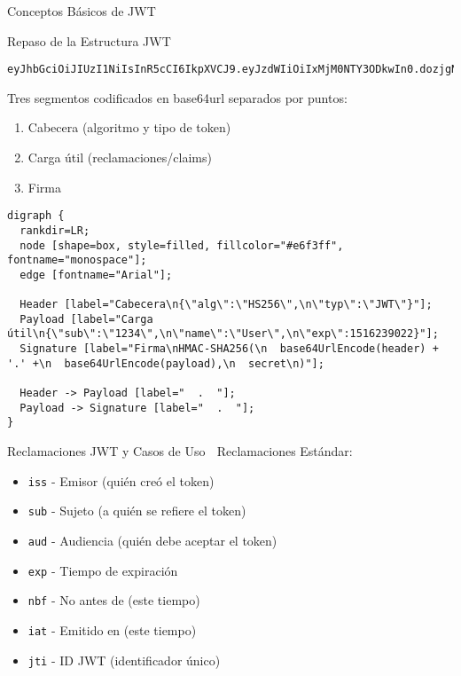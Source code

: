 \documentclass[presentation,aspectratio=169]{beamer}
\begin{document}
\begin{frame}[label={sec:org86199bc},fragile]{Conceptos Básicos de JWT}
 \begin{block}{Repaso de la Estructura JWT 🔰}
\begin{verbatim}
eyJhbGciOiJIUzI1NiIsInR5cCI6IkpXVCJ9.eyJzdWIiOiIxMjM0NTY3ODkwIn0.dozjgNryP4J3jVmNHl0w5N_XgL0n3I9PlFUP0THsR8U
\end{verbatim}

Tres segmentos codificados en base64url separados por puntos:
\begin{enumerate}
\item \alert{Cabecera} (algoritmo y tipo de token)
\item \alert{Carga útil} (reclamaciones/claims)
\item \alert{Firma}
\end{enumerate}

\begin{verbatim}
digraph {
  rankdir=LR;
  node [shape=box, style=filled, fillcolor="#e6f3ff", fontname="monospace"];
  edge [fontname="Arial"];

  Header [label="Cabecera\n{\"alg\":\"HS256\",\n\"typ\":\"JWT\"}"];
  Payload [label="Carga útil\n{\"sub\":\"1234\",\n\"name\":\"User\",\n\"exp\":1516239022}"];
  Signature [label="Firma\nHMAC-SHA256(\n  base64UrlEncode(header) + '.' +\n  base64UrlEncode(payload),\n  secret\n)"];

  Header -> Payload [label="  .  "];
  Payload -> Signature [label="  .  "];
}
\end{verbatim}
\end{block}
\begin{block}{Reclamaciones JWT y Casos de Uso 🔰}
\alert{Reclamaciones Estándar:}
\begin{itemize}
\item \texttt{iss} - Emisor (quién creó el token)
\item \texttt{sub} - Sujeto (a quién se refiere el token)
\item \texttt{aud} - Audiencia (quién debe aceptar el token)
\item \texttt{exp} - Tiempo de expiración
\item \texttt{nbf} - No antes de (este tiempo)
\item \texttt{iat} - Emitido en (este tiempo)
\item \texttt{jti} - ID JWT (identificador único)
\end{itemize}


\end{block}
\end{frame}
\end{document}
